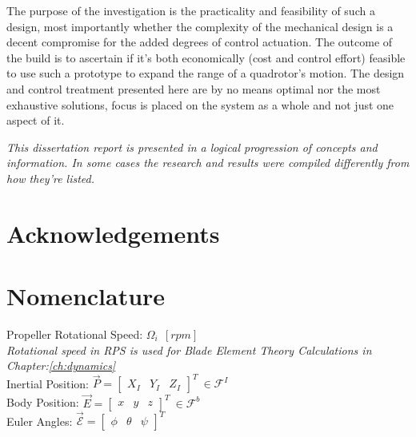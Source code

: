 \documentclass[a4paper, 11pt, oneside, openright, parskip=full]{book}
\begin{document}
\par
The purpose of the investigation is the practicality and feasibility of such a design, most importantly whether the complexity of the mechanical design is a decent compromise for the added degrees of control actuation. The outcome of the build is to ascertain if it's both economically (cost and control effort) feasible to use such a prototype to expand the range of a quadrotor's motion. The design and control treatment presented here are by no means optimal nor the most exhaustive solutions, focus is placed on the system as a whole and not just one aspect of it.
\par
\emph{This dissertation report is presented in a logical progression of concepts and information. In some cases the research and results were compiled differently from how they're listed.}
\chapter{Acknowledgements}		
\label{ch:ack}
\chapter{Nomenclature}
\label{ch:nom}
Propeller Rotational Speed: $\Omega_i~~[rpm]$
\\
\emph{\color{Gray} Rotational speed in RPS is used for Blade Element Theory Calculations in Chapter:\ref{ch:dynamics}}
\\
Inertial Position: $\vec{P}=\begin{bmatrix}
X_I & Y_I & Z_I
\end{bmatrix}^T~\in\mathcal{F}^I$
\\
Body Position: $\vec{E}=\begin{bmatrix}
x & y & z
\end{bmatrix}^T~\in\mathcal{F}^b$
\\
Euler Angles: $\vec{\mathcal{E}}=\begin{bmatrix}
\phi & \theta & \psi
\end{bmatrix}^T$

\tableofcontents
\end{document}
